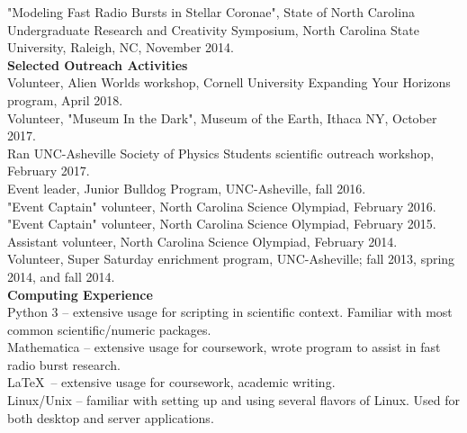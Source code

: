 \documentclass[a4paper, 11pt]{article}
\newcommand{\noi}{\noindent}
\begin{document}
\noi "Modeling Fast Radio Bursts in Stellar Coronae", State of North Carolina Undergraduate Research and Creativity Symposium, North Carolina State University, Raleigh, NC, November 2014.
\\

\noi \textbf{Selected Outreach Activities}
\\

\noi Volunteer, Alien Worlds workshop, Cornell University Expanding Your Horizons program, April 2018.
\\

\noi Volunteer, "Museum In the Dark", Museum of the Earth, Ithaca NY, October 2017.
\\

\noi Ran UNC-Asheville Society of Physics Students scientific outreach workshop, February 2017.
\\

\noi Event leader, Junior Bulldog Program, UNC-Asheville, fall 2016. 
\\

\noi "Event Captain" volunteer, North Carolina Science Olympiad, February 2016.
\\

\noi "Event Captain" volunteer, North Carolina Science Olympiad, February 2015.
\\

\noi Assistant volunteer, North Carolina Science Olympiad, February 2014.
\\

\noi Volunteer, Super Saturday enrichment program, UNC-Asheville; fall 2013, spring 2014, and fall 2014.
\\


\noi \textbf{Computing Experience} 
\\

\noi Python 3 -- extensive usage for scripting in scientific context. Familiar with most common scientific/numeric packages.
\\

\noi Mathematica -- extensive usage for coursework, wrote program to assist in fast radio burst research.
\\

\noi \LaTeX \, -- extensive usage for coursework, academic writing.
\\

\noi Linux/Unix -- familiar with setting up and using several flavors of Linux. Used for both desktop and server applications.
\\
\end{document}
